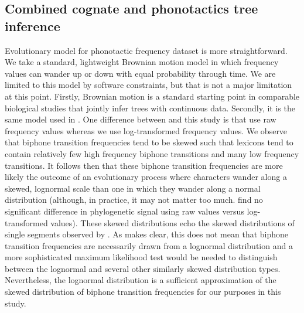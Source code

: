 \documentclass[]{article}
\begin{document}
\hypertarget{pn-tree-combined}{%
\subsection{Combined cognate and phonotactics tree inference}\label{pn-tree-combined}}

Evolutionary model for phonotactic frequency dataset is more straightforward. We take a standard, lightweight Brownian motion model in which frequency values can wander up or down with equal probability through time. We are limited to this model by software constraints, but that is not a major limitation at this point. Firstly, Brownian motion is a standard starting point in comparable biological studies that jointly infer trees with continuous data. Secondly, it is the same model used in \textcite{macklin-cordes_phylogenetic_2020}. One difference between \textcite{macklin-cordes_phylogenetic_2020} and this study is that \textcite{macklin-cordes_phylogenetic_2020} use raw frequency values whereas we use log-transformed frequency values. We observe that biphone transition frequencies tend to be skewed such that lexicons tend to contain relatively few high frequency biphone transitions and many low frequency transitions. It follows then that these biphone transition frequencies are more likely the outcome of an evolutionary process where characters wander along a skewed, lognormal scale than one in which they wander along a normal distribution (although, in practice, it may not matter too much. \textcite{macklin-cordes_phylogenetic_2020} find no significant difference in phylogenetic signal using raw values versus log-transformed values). These skewed distributions echo the skewed distributions of single segments observed by \textcite{macklin-cordes_re-evaluating_2020}. As \textcite{macklin-cordes_re-evaluating_2020} makes clear, this does not mean that biphone transition frequencies are necessarily drawn from a lognormal distribution and a more sophisticated maximum likelihood test would be needed to distinguish between the lognormal and several other similarly skewed distribution types. Nevertheless, the lognormal distribution is a sufficient approximation of the skewed distribution of biphone transition frequencies for our purposes in this study.
\end{document}
